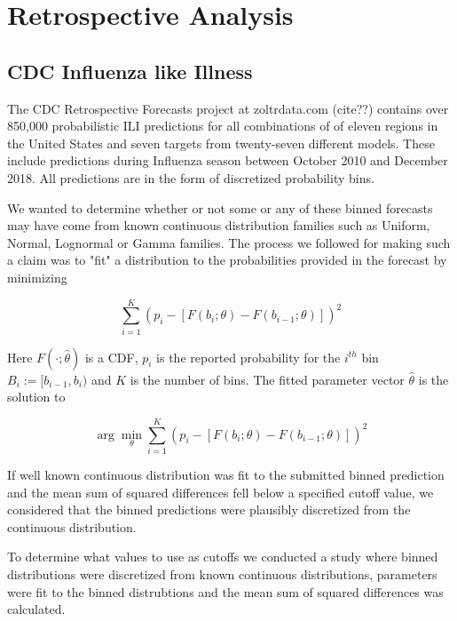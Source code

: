 \documentclass{article}\usepackage[]{graphicx}\usepackage[]{color}
\begin{document}

\newpage


\section{Retrospective Analysis}

\subsection{CDC Influenza like Illness}
The CDC Retrospective Forecasts project at zoltrdata.com (cite??) contains over
850,000 probabilistic ILI predictions for all combinations of of eleven regions 
in the United States and seven targets from twenty-seven different models. These
include predictions during Influenza season between October 2010 and December
2018. All predictions are in the form of discretized probability bins. 

We wanted to determine whether or not some or any of these binned forecasts may
have come from known continuous distribution families such as Uniform, Normal, 
Lognormal or Gamma families. The process we followed for making such a claim was
to "fit" a distribution to the probabilities provided in the forecast by
minimizing

\begin{equation}
  \sum_{i=1}^K (p_i - [F(b_i; \theta) - F(b_{i-1}; \theta)])^2
\end{equation}

Here $F(\cdot; \hat{\theta})$ is a CDF, $p_i$ is the reported probability for 
the $i^{th}$ bin $B_i := [b_{i-1}, b_i)$ and $K$ is the number of bins.
The fitted parameter vector $\hat{\theta}$ is the solution to 

\begin{equation}
\arg\min_{\theta}\sum_{i=1}^K (p_i - 
[F(b_i; \theta) - F(b_{i-1}; \theta)])^2
\end{equation}

If well known continuous distribution was fit to the submitted binned prediction
and the mean sum of squared differences fell below a specified cutoff value, we
considered that the binned predictions were plausibly discretized from the 
continuous distribution.


To determine what values to use as cutoffs we conducted a study where 
binned distributions were discretized from known continuous distributions, 
parameters were fit to the binned distrubtions and the mean sum of squared 
differences was calculated.
\end{document}
